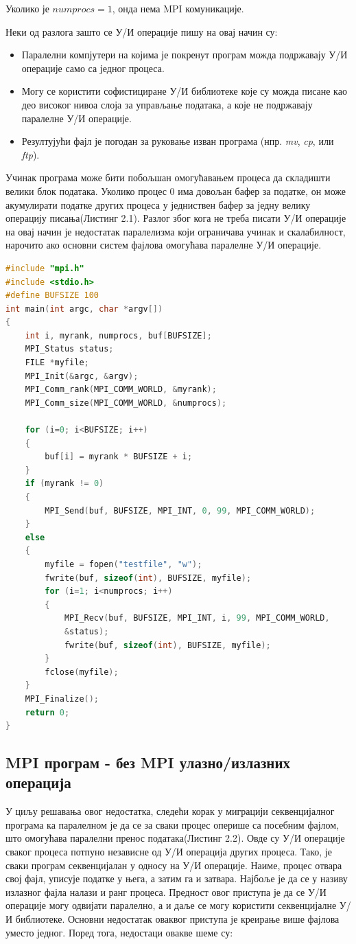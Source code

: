 Уколико је $numprocs=1$, онда нема MPI комуникације. 

Неки од разлога зашто се У/И операције пишу на овај начин су:

\begin{itemize}
\item  Паралелни компјутери на којима је покренут програм можда подржавају У/И операције само са једног процеса.
\item Могу се користити софистициране У/И библиотеке које су можда писане као део високог нивоа слоја за управљање података, а које не подржавају паралелне У/И операције.
\item Резултујући фајл је погодан за руковање изван програма (нпр. \textit{mv}, \textit{cp}, или \textit{ftp}).
\end{itemize}

Учинак програма може бити побољшан омогућавањем процеса да складишти велики блок података. Уколико процес 0 има довољан бафер за податке, он може акумулирати податке других процеса у једниствен бафер за једну велику операцију писања(Листинг 2.1). Разлог због кога не треба писати У/И операције на овај начин је недостатак паралелизма који ограничава учинак и скалабилност, нарочито ако основни систем фајлова омогућава паралелне У/И операције.

\begin{lstlisting}[style=nonumbers,frame=single,language=C, caption= MPI програм ]
#include "mpi.h"
#include <stdio.h>
#define BUFSIZE 100
int main(int argc, char *argv[])
{
	int i, myrank, numprocs, buf[BUFSIZE];
	MPI_Status status;
	FILE *myfile;
	MPI_Init(&argc, &argv);
	MPI_Comm_rank(MPI_COMM_WORLD, &myrank);
	MPI_Comm_size(MPI_COMM_WORLD, &numprocs);

	for (i=0; i<BUFSIZE; i++)
	{
		buf[i] = myrank * BUFSIZE + i;
	}
	if (myrank != 0)
	{
		MPI_Send(buf, BUFSIZE, MPI_INT, 0, 99, MPI_COMM_WORLD);
	}
	else
	{
		myfile = fopen("testfile", "w");
		fwrite(buf, sizeof(int), BUFSIZE, myfile);
		for (i=1; i<numprocs; i++)
		{
			MPI_Recv(buf, BUFSIZE, MPI_INT, i, 99, MPI_COMM_WORLD,
			&status);
			fwrite(buf, sizeof(int), BUFSIZE, myfile);
		}
		fclose(myfile);
	}
	MPI_Finalize();
	return 0;
}
\end{lstlisting}

\subsection{MPI програм - без MPI улазно/излазних операција}
У циљу решавања овог недостатка, следећи корак у миграцији секвенцијалног програма ка паралелном је да се за сваки процес оперише са посебним фајлом, што омогућава паралелни пренос података(Листинг 2.2). Овде су У/И операције сваког процеса потпуно независне од У/И операција других процеса. Тако, је сваки програм секвенцијалан у односу на У/И операције. Наиме, процес отвара свој фајл, уписује податке у њега, а затим га и затвара. Најбоље је да се у називу излазног фајла налази и ранг процеса. Предност овог приступа је да се У/И операције могу одвијати паралелно, а и даље се могу користити секвенцијалне У/И библиотеке. Основни недостатак оваквог приступа је креирање више фајлова уместо једног. Поред тога, недостаци овакве шеме су:

